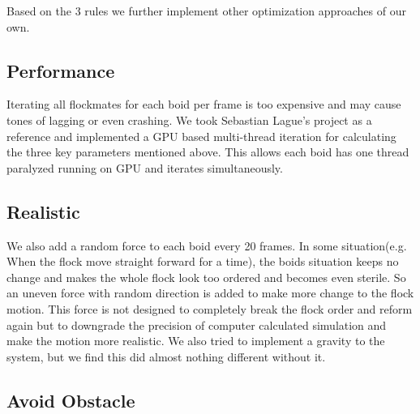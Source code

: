 Based on the 3 rules we further implement other optimization approaches of our own. 
\subsection{Performance}
Iterating all flockmates for each boid per frame is too expensive and may cause tones of lagging or even crashing. We took Sebastian Lague’s project as a reference and implemented a GPU based multi-thread iteration for calculating the three key parameters mentioned above. This allows each boid has one thread paralyzed running on GPU and iterates simultaneously. 

\subsection{Realistic}
We also add a random force to each boid every 20 frames. In some situation(e.g. When the flock move straight forward for a time), the boids situation keeps no change and makes the whole flock look too ordered and becomes even sterile. So an uneven force with random direction is added to make more change to the flock motion. This force is not designed to completely break the flock order and reform again but to downgrade the precision of computer calculated simulation and make the motion more realistic. We also tried to implement a gravity to the system, but we find this did almost nothing different without it.

\subsection{Avoid Obstacle}


